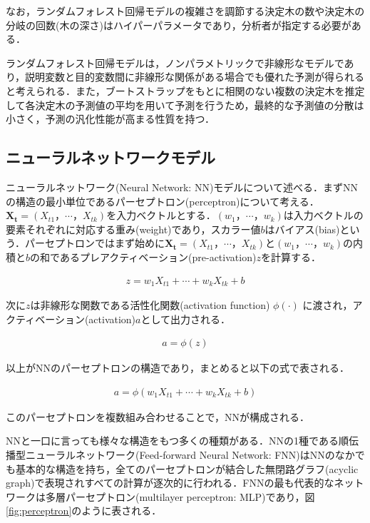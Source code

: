 \documentclass[a4paper，12pt]{jsarticle}
\begin{document}
なお，ランダムフォレスト回帰モデルの複雑さを調節する決定木の数や決定木の分岐の回数(木の深さ)はハイパーパラメータであり，分析者が指定する必要がある．

ランダムフォレスト回帰モデルは，ノンパラメトリックで非線形なモデルであり，説明変数と目的変数間に非線形な関係がある場合でも優れた予測が得られると考えられる．また，ブートストラップをもとに相関のない複数の決定木を推定して各決定木の予測値の平均を用いて予測を行うため，最終的な予測値の分散は小さく，予測の汎化性能が高まる性質を持つ．

\subsection{ニューラルネットワークモデル}

ニューラルネットワーク(Neural Network: NN)モデルについて述べる．まずNNの構造の最小単位であるパーセプトロン(perceptron)について考える．$\bm{X_t}=(X_{t1}，\cdots，X_{tk})$を入力ベクトルとする．$(w_1，\cdots，w_k)$は入力ベクトルの要素それぞれに対応する重み(weight)であり，スカラー値$b$はバイアス(bias)という．パーセプトロンではまず始めに$\bm{X_t}=(X_{t1}，\cdots，X_{tk})$と$(w_1，\cdots，w_k)$の内積と$b$の和であるプレアクティベーション(pre-activation)$z$を計算する．

\begin{equation}
  \begin{split}
    z = w_1 X_{t1} + \cdots + w_k X_{tk} + b
  \end{split}
\end{equation}

次に$z$は非線形な関数である活性化関数(activation function) $\phi(\cdot)$ に渡され，アクティベーション(activation)$a$として出力される．

\begin{equation}
  \begin{split}
    a = \phi(z)
  \end{split}
\end{equation}

以上がNNのパーセプトロンの構造であり，まとめると以下の式で表される．

\begin{equation}
  \begin{split}
    a = \phi(w_1 X_{t1} + \cdots + w_k X_{tk} + b)
  \end{split}
\end{equation}

このパーセプトロンを複数組み合わせることで，NNが構成される．

NNと一口に言っても様々な構造をもつ多くの種類がある．NNの1種である順伝播型ニューラルネットワーク(Feed-forward Neural Network: FNN)はNNのなかでも基本的な構造を持ち，全てのパーセプトロンが結合した無閉路グラフ(acyclic graph)で表現されすべての計算が逐次的に行われる．FNNの最も代表的なネットワークは多層パーセプトロン(multilayer perceptron: MLP)であり，図\ref{fig:perceptron}のように表される．
\end{document}
